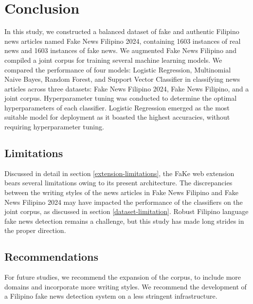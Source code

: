 \chapter{Conclusion}

In this study, we constructed a balanced dataset of fake and authentic Filipino news articles named Fake News Filipino 2024, containing 1603 instances of real news and 1603 instances of fake news. We augmented Fake News Filipino and compiled a joint corpus for training several machine learning models. We compared the performance of four models: Logistic Regression, Multinomial Naive Bayes, Random Forest, and Support Vector Classifier in classifying news articles across three datasets: Fake News Filipino 2024, Fake News Filipino, and a joint corpus. Hyperparameter tuning was conducted to determine the optimal hyperparameters of each classifier. Logistic Regression emerged as the most suitable model for deployment as it boasted the highest accuracies, without requiring hyperparameter tuning.

\section{Limitations}

Discussed in detail in section \ref{extension-limitations}, the FaKe web extension bears several limitations owing to its present architecture. The discrepancies between the writing styles of the news articles in Fake News Filipino and Fake News Filipino 2024 may have impacted the performance of the classifiers on the joint corpus, as discussed in section \ref{dataset-limitation}. Robust Filipino language fake news detection remains a challenge, but this study has made long strides in the proper direction.

\section{Recommendations}

For future studies, we recommend the expansion of the corpus, to include more domains and incorporate more writing styles. We recommend the development of a Filipino fake news detection system on a less stringent infrastructure. 